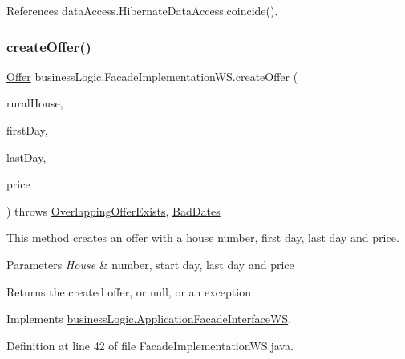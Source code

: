 References data\+Access.\+Hibernate\+Data\+Access.\+coincide().

\mbox{\label{classbusinessLogic_1_1FacadeImplementationWS_ac7b3bdfd0815ea7c787da312de594cce}} 
\subsubsection{\texorpdfstring{createOffer()}{createOffer()}}
{\footnotesize\ttfamily \mbox{\hyperlink{classdomain_1_1Offer}{Offer}} business\+Logic.\+Facade\+Implementation\+W\+S.\+create\+Offer (\begin{DoxyParamCaption}\item[{\mbox{\hyperlink{classdomain_1_1RuralHouse}{Rural\+House}}}]{rural\+House,  }\item[{Date}]{first\+Day,  }\item[{Date}]{last\+Day,  }\item[{float}]{price }\end{DoxyParamCaption}) throws \mbox{\hyperlink{classexceptions_1_1OverlappingOfferExists}{Overlapping\+Offer\+Exists}}, \mbox{\hyperlink{classexceptions_1_1BadDates}{Bad\+Dates}}}



This method creates an offer with a house number, first day, last day and price. 


\begin{DoxyParams}{Parameters}
{\em House} & number, start day, last day and price \\
\hline
\end{DoxyParams}
\begin{DoxyReturn}{Returns}
the created offer, or null, or an exception 
\end{DoxyReturn}


Implements \mbox{\hyperlink{interfacebusinessLogic_1_1ApplicationFacadeInterfaceWS_a0e8d2135ef1384a32e74f60bcea55f09}{business\+Logic.\+Application\+Facade\+Interface\+WS}}.



Definition at line 42 of file Facade\+Implementation\+W\+S.\+java.


